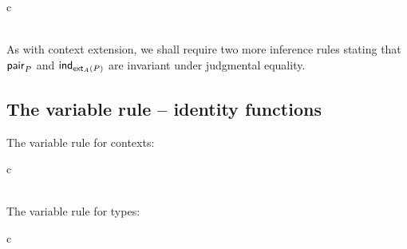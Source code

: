 \begin{infarray}{c}
\inference{}
{}\\
  {}\\
  {}
\end{infarray}

As with context extension, we shall require two more inference rules stating that
$\mathsf{pair}_P$ and $\mathsf{ind}_{\mathsf{ext}_A(P)}$ are invariant under judgmental equality.

\subsection{The variable rule -- identity functions}
The variable rule for contexts:
\begin{infarray}{c}
\inference{\jctx{\Gamma}}{\jterm{\Gamma}{\ctxwk{\Gamma}{\Gamma}}{\idfunc[\Gamma]}}\\
\\
\end{infarray}


The variable rule for types:
\begin{infarray}{c}
\\
\\
\\
\\
\end{infarray}

